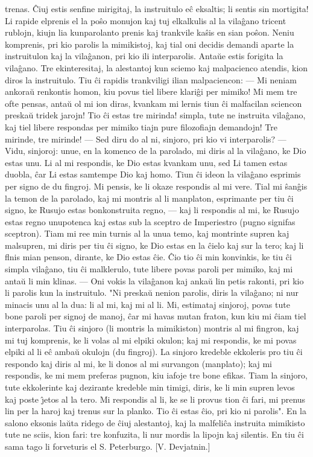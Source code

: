 trenas. \^Ciuj estis senfine mirigitaj, la instruitulo e\^c
eksaltis; li sentis sin mortigita! Li rapide elprenis el la po\^so
monujon kaj tuj elkalkulis al la vila\^gano tricent rublojn, kiujn
lia kunparolanto prenis kaj trankvile ka\^sis en sian po\^son. Neniu
komprenis, pri kio parolis la mimikistoj, kaj tial oni decidis
demandi aparte la instruitulon kaj la vila\^ganon, pri kio ili
interparolis. Anta\u ue estis forigita la vila\^gano. Tre
ekinteresitaj, la alestantoj kun sciemo kaj malpacienco atendis,
kion diros la instruitulo. Tiu \^ci rapidis trankviligi ilian
malpaciencon: --- Mi neniam ankora\u u renkontis homon, kiu povus
tiel libere klari\^gi per mimiko! Mi mem tre ofte pensas, anta\u u
ol mi ion diras, kvankam mi lernis tiun \^ci malfacilan sciencon
preska\u u tridek jarojn! Tio \^ci estas tre mirinda! simpla, tute
ne instruita vila\^gano, kaj tiel libere respondas per mimiko tiajn
pure filozofiajn demandojn! Tre mirinde, tre mirinde! --- Sed diru
do al ni, sinjoro, pri kio vi interparolis? --- Vidu, sinjoroj:
unue, en la komenco de la parolado, mi diris al la vila\^gano, ke
Dio estas unu. Li al mi respondis, ke Dio estas kvankam unu, sed Li
tamen estas duobla, \^car Li estas samtempe Dio kaj homo. Tiun \^ci
ideon la vila\^gano esprimis per signo de du fingroj. Mi pensis, ke
li okaze respondis al mi vere. Tial mi \^san\^gis la temon de la
parolado, kaj mi montris al li manplaton, esprimante per tiu \^ci
signo, ke Rusujo estas bonkonstruita regno, --- kaj li respondis al
mi, ke Rusujo estas regno unupotenca kaj estas sub la sceptro de
Imperiestro (pugno signifas sceptron). Tiam mi ree min turnis al la
unua temo, kaj montrinte supren kaj malsupren, mi diris per tiu \^ci
signo, ke Dio estas en la \^cielo kaj sur la tero; kaj li flnis mian
penson, dirante, ke Dio estas \^cie. \^Cio tio \^ci min konvinkis,
ke tiu \^ci simpla vila\^gano, tiu \^ci malklerulo, tute libere
povas paroli per mimiko, kaj mi anta\u u li min klinas. --- Oni
vokis la vila\^ganon kaj anka\u u lin petis rakonti, pri kio li
parolis kun la instruitulo. "Ni preska\u u nenion parolis, diris la
vila\^gano; ni nur minacis unu al la dua: li al mi, kaj mi al li.
Mi, estimataj sinjoroj, povas tute bone paroli per signoj de manoj,
\^car mi havas mutan fraton, kun kiu mi \^ciam tiel interparolas.
Tiu \^ci sinjoro (li montris la mimikiston) montris al mi fingron,
kaj mi tuj komprenis, ke li volas al mi elpiki okulon; kaj mi
respondis, ke mi povas elpiki al li e\^c amba\u u okulojn (du
fingroj). La sinjoro kredeble ekkoleris pro tiu \^ci respondo kaj
diris al mi, ke li donos al mi survangon (manplato); kaj mi
respondis, ke mi mem preferas pugnon, kiu iafoje tre bone efikas.
Tiam la sinjoro, tute ekkolerinte kaj dezirante kredeble min timigi,
diris, ke li min supren levos kaj poste \^{\j}etos al la tero. Mi
respondis al li, ke se li provus tion \^ci fari, mi prenus lin per
la haroj kaj trenus sur la planko. Tio \^ci estas \^cio, pri kio ni
parolis". En la salono eksonis la\u uta ridego de \^ciuj
alestantoj, kaj la malfeli\^ca instruita mimikisto tute ne sciis,
kion fari: tre konfuzita, li nur mordis la lipojn kaj silentis. En
tiu \^ci sama tago li forveturis el S. Peterburgo. [V. Devjatnin.]

